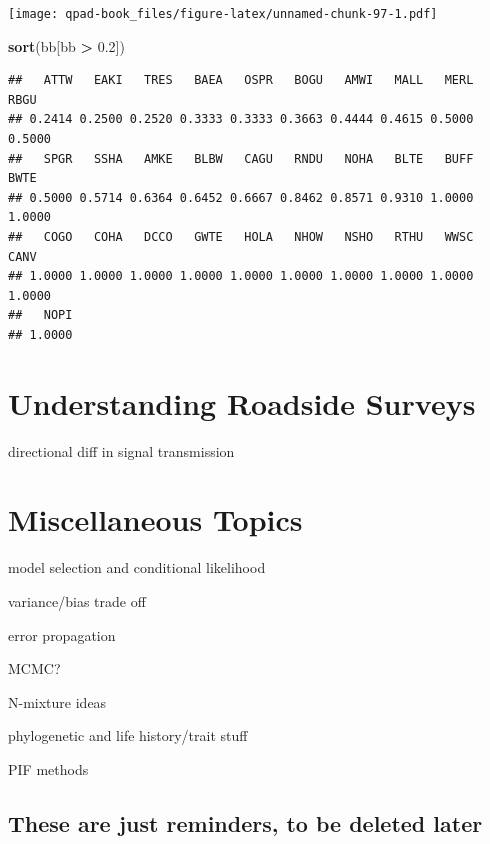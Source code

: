 \documentclass[12pt,]{book}
\newenvironment{Shaded}{\begin{snugshade}}{\end{snugshade}}
\newcommand{\FloatTok}[1]{\textcolor[rgb]{0.00,0.00,0.81}{#1}}
\newcommand{\KeywordTok}[1]{\textcolor[rgb]{0.13,0.29,0.53}{\textbf{#1}}}
\newcommand{\NormalTok}[1]{#1}
\newcommand{\OperatorTok}[1]{\textcolor[rgb]{0.81,0.36,0.00}{\textbf{#1}}}
\newcommand{\StringTok}[1]{\textcolor[rgb]{0.31,0.60,0.02}{#1}}
\begin{document}
\texttt{[image: qpad-book\_files/figure-latex/unnamed-chunk-97-1.pdf]}

\begin{Shaded}
\begin{Highlighting}[]
\KeywordTok{sort}\NormalTok{(bb[bb }\OperatorTok{>}\StringTok{ }\FloatTok{0.2}\NormalTok{])}
\end{Highlighting}
\end{Shaded}

\begin{verbatim}
##   ATTW   EAKI   TRES   BAEA   OSPR   BOGU   AMWI   MALL   MERL   RBGU 
## 0.2414 0.2500 0.2520 0.3333 0.3333 0.3663 0.4444 0.4615 0.5000 0.5000 
##   SPGR   SSHA   AMKE   BLBW   CAGU   RNDU   NOHA   BLTE   BUFF   BWTE 
## 0.5000 0.5714 0.6364 0.6452 0.6667 0.8462 0.8571 0.9310 1.0000 1.0000 
##   COGO   COHA   DCCO   GWTE   HOLA   NHOW   NSHO   RTHU   WWSC   CANV 
## 1.0000 1.0000 1.0000 1.0000 1.0000 1.0000 1.0000 1.0000 1.0000 1.0000 
##   NOPI 
## 1.0000
\end{verbatim}

\hypertarget{roadsides}{%
\chapter{Understanding Roadside Surveys}\label{roadsides}}

directional diff in signal transmission

\hypertarget{extras}{%
\chapter{Miscellaneous Topics}\label{extras}}

model selection and conditional likelihood

variance/bias trade off

error propagation

MCMC?

N-mixture ideas

phylogenetic and life history/trait stuff

PIF methods

\hypertarget{these-are-just-reminders-to-be-deleted-later}{%
\section*{These are just reminders, to be deleted later}\label{these-are-just-reminders-to-be-deleted-later}}
\end{document}
